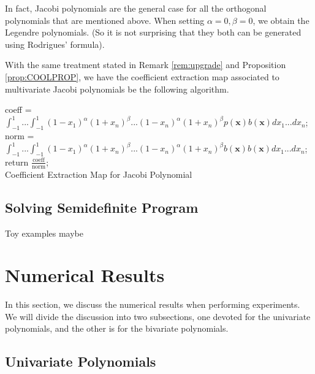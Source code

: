 \documentclass[12pt]{amsart}
\numberwithin{equation}{section}
\theoremstyle{definition}
\numberwithin{thm}{section}
\begin{document}
In fact, Jacobi polynomials are the general case for all the orthogonal polynomials that are mentioned above. 
When setting $\alpha = 0, \beta = 0$, we obtain the Legendre polynomials. (So it is not surprising that they both can be generated using Rodrigues' formula).

With the same treatment stated in Remark \ref{rem:upgrade} and Proposition \ref{prop:COOLPROP},
we have the {coefficient extraction map} associated to multivariate Jacobi polynomials be the following algorithm.

\begin{algorithm}[H]
     \SetAlgoLined
     coeff = $\int_{-1}^1 ... \int_{-1}^1 (1-x_1)^{\alpha} (1+x_n)^{\beta} ... (1-x_n)^{\alpha} (1+x_n)^{\beta} p(\mathbf{x})b(\mathbf{x}) dx_1 ... dx_n$;\\
     norm = $\int_{-1}^1 ... \int_{-1}^1 (1-x_1)^{\alpha} (1+x_n)^{\beta} ... (1-x_n)^{\alpha} (1+x_n)^{\beta} b(\mathbf{x}) b(\mathbf{x}) dx_1 ... dx_n$;\\
     return $\frac{\text{coeff}}{\text{norm}}$;\\
     \caption{Coefficient Extraction Map for Jacobi Polynomial}
\end{algorithm}

\newpage


\subsection{Solving Semidefinite Program}
\label{Sec:Solving Semidefinite Program}




Toy examples maybe

\newpage
\section{Numerical Results}

In this section, we discuss the numerical results when performing experiments. 
We will divide the discussion into two subsections, one devoted for the univariate polynomials, 
and the other is for the bivariate polynomials. 

\subsection{Univariate Polynomials}
\end{document}
